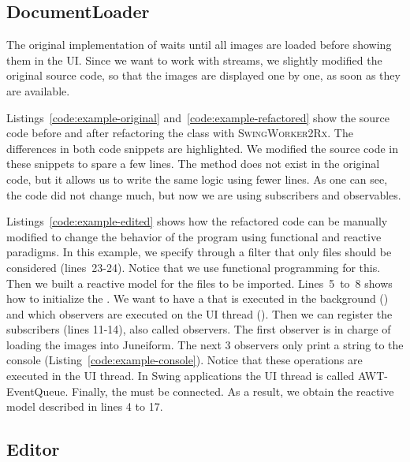 \documentclass[type=bsc,accentcolor=tud9c]{tudthesis}
\newcommand{\framework}[1]{\textcolor{black!65}{#1}}
\newcommand{\toolextension}{\textsc{SwingWorker2Rx}}
\begin{document}
\subsection{DocumentLoader}
The original implementation of  waits until all images are loaded before showing them in the UI. Since we want to work with streams, we slightly modified the original source code, so that the images are displayed one by one, as soon as they are available.

Listings~\ref{code:example-original} and~\ref{code:example-refactored} show the source code before and after refactoring  the class  with \toolextension{}. The differences in both code snippets are highlighted. We modified the source code in these snippets to spare a few lines. The method  does not exist in the original code, but it allows us to write the same logic using fewer lines. As one can see, the code did not change much, but now we are using subscribers and observables. 



Listings~\ref{code:example-edited} shows how the refactored code can be manually modified to change the behavior of the program using functional and reactive paradigms. In this example, we specify through a filter that only  files should be considered (lines~23-24). Notice that we use functional programming for this. Then we built a reactive model for the files to be imported. Lines~5~to~8 shows how to initialize the . We want to have a  that is executed in the background () and which observers are executed on the UI thread (). Then we can register the subscribers (lines 11-14), also called observers. The first observer is in charge of loading the images into \framework{Juneiform}. The next 3 observers only print a string to the console (Listing~\ref{code:example-console}). Notice that these operations are executed in the UI thread. In \framework{Swing} applications the UI thread is called \framework{AWT-EventQueue}. Finally, the  must be connected. As a result, we obtain the reactive model described in lines 4 to 17.





\subsection{Editor}
\end{document}

